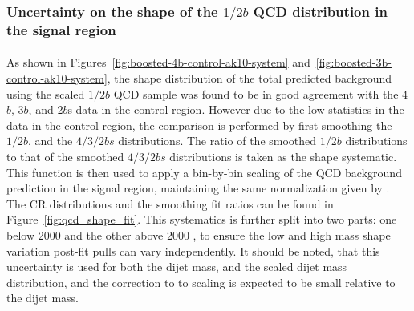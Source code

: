\clearpage
\subsubsection{Uncertainty on the shape of the $1/2b$ QCD distribution in the signal region}
\label{unc-shape-qcd-in-sr}

\paragraph{}
As shown in Figures~\ref{fig:boosted-4b-control-ak10-system} and~\ref{fig:boosted-3b-control-ak10-system}, the shape distribution of the total predicted background using the scaled $1/2b$ QCD sample was found to be in good agreement with the 4$b$, 3$b$, and 2$b$s data in the control region.  However due to the low statistics in the data in the control region, the comparison is performed by first smoothing the $1/2b$, and the $4/3/2bs$ distributions. The ratio of the smoothed $1/2b$ distributions to that of the smoothed $4/3/2bs$ distributions is taken as the shape systematic. This function is then used to apply a bin-by-bin scaling of the QCD background prediction in the signal region, maintaining the same normalization given by \muqcd.  The CR distributions and the smoothing fit ratios can be found in Figure~\ref{fig:qcd_shape_fit}. This systematics is further split into two parts: one below 2000 \GeV and the other above 2000 \GeV, to ensure the low and high mass shape variation post-fit pulls can vary independently. It should be noted, that this uncertainty is used for both the dijet mass, and the scaled dijet mass distribution, and the correction to to scaling is expected to be small relative to the dijet mass. 

